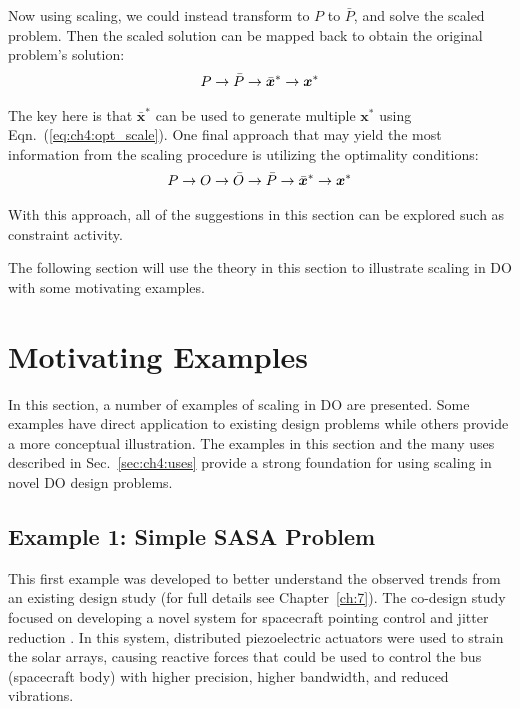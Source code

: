 Now using scaling, we could instead transform to $P$ to $\bar{P}$, and solve the scaled problem. Then the scaled solution can be mapped back to obtain the original problem's solution:
\begin{align*}
P \to \bar{P} \to \bar{\bm{x}}^* \to \bm{x}^*
\end{align*}

\noindent The key here is that $\bar{\bm{x}}^*$ can be used to generate multiple $\bm{x}^*$ using Eqn.~(\ref{eq:ch4:opt_scale}). One final approach that may yield the most information from the scaling procedure is utilizing the optimality conditions:
\begin{align*}
P \to O \to \bar{O} \to \bar{P} \to \bar{\bm{x}}^* \to \bm{x}^*
\end{align*}

\noindent With this approach, all of the suggestions in this section can be explored such as constraint activity.



The following section will use the theory in this section to illustrate scaling in DO with some motivating examples.

\section{Motivating Examples}
In this section, a number of examples of scaling in DO are presented. Some examples have direct application to existing design problems while others provide a more conceptual illustration. The examples in this section and the many uses described in Sec.~\ref{sec:ch4:uses} provide a strong foundation for using scaling in novel DO design problems. 

\subsection{Example 1: Simple SASA Problem\label{sec:ch4:sasa}}

This first example was developed to better understand the observed trends from an existing design study (for full details see Chapter~\ref{ch:7}).
The co-design study focused on developing a novel  system for spacecraft pointing control and jitter reduction \cite{Chilan2017a}.
In this system, distributed piezoelectric actuators were used to strain the solar arrays, causing reactive forces that could be used to control the bus (spacecraft body) with higher precision, higher bandwidth, and reduced vibrations.

